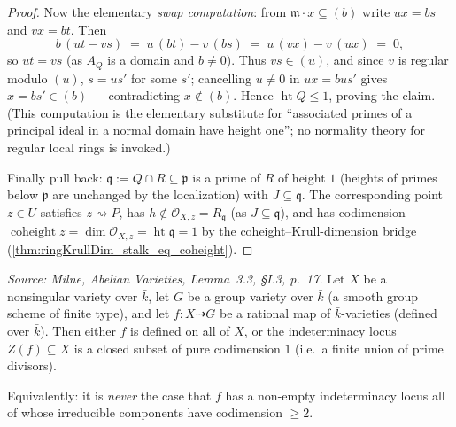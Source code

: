 \begin{proof}
  Now the elementary \emph{swap computation}: from \(\mathfrak m \cdot x \subseteq (b)\)
  write \(u x = b s\) and \(v x = b t\). Then
  \[
    b \,(u t - v s) \;=\; u\,(b t) - v\,(b s) \;=\; u\,(v x) - v\,(u x) \;=\; 0,
  \]
  so \(u t = v s\) (as \(A_Q\) is a domain and \(b \neq 0\)). Thus \(v s \in (u)\), and
  since \(v\) is regular modulo \((u)\), \(s = u s'\) for some \(s'\); cancelling
  \(u \neq 0\) in \(u x = b u s'\) gives \(x = b s' \in (b)\) --- contradicting
  \(x \notin (b)\). Hence \(\operatorname{ht} Q \leq 1\), proving the claim. (This
  computation is the elementary substitute for ``associated primes of a principal ideal
  in a normal domain have height one''; no normality theory for regular local rings is
  invoked.)

  Finally pull back: \(\mathfrak q := Q \cap R \subseteq \mathfrak p\) is a prime of
  \(R\) of height \(1\) (heights of primes below \(\mathfrak p\) are unchanged by the
  localization) with \(J \subseteq \mathfrak q\). The corresponding point \(z \in U\)
  satisfies \(z \rightsquigarrow P\), has \(h \notin \mathcal O_{X, z} = R_{\mathfrak q}\)
  (as \(J \subseteq \mathfrak q\)), and has codimension
  \(\operatorname{coheight} z = \dim \mathcal O_{X, z} = \operatorname{ht} \mathfrak q
  = 1\) by the coheight--Krull-dimension bridge
  (\cref{thm:ringKrullDim_stalk_eq_coheight}).
\end{proof}

\begin{lemma}
  \label{lem:milne_codim1_indeterminacy}
  \leanok
  \textit{Source: Milne, \emph{Abelian Varieties}, Lemma~3.3, \S I.3, p.~17.}
  Let \(X\) be a nonsingular variety over \(\bar k\), let \(G\) be a group variety over
  \(\bar k\) (a smooth group scheme of finite type), and let \(f \colon X \dashrightarrow
  G\) be a rational map of \(\bar k\)-varieties (defined over \(\bar k\)).
  Then either \(f\) is defined on all of \(X\), or the indeterminacy
  locus \(Z(f) \subseteq X\) is a closed subset of pure codimension \(1\) (i.e.\ a finite
  union of prime divisors).

  Equivalently: it is \emph{never} the case that \(f\) has a non-empty indeterminacy
  locus all of whose irreducible components have codimension \(\geq 2\).
\end{lemma}

